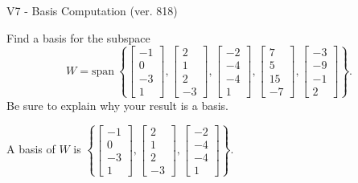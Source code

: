 \begin{exercise}
  \begin{exerciseTitle}V7 - Basis Computation (ver. 818)\end{exerciseTitle}
  \begin{exerciseStatement}
    Find a basis for the subspace 
\[W=\mathrm{span}\ \left\{\left[\begin{array}{r}
-1 \\
0 \\
-3 \\
1
\end{array}\right] , \left[\begin{array}{r}
2 \\
1 \\
2 \\
-3
\end{array}\right] , \left[\begin{array}{r}
-2 \\
-4 \\
-4 \\
1
\end{array}\right] , \left[\begin{array}{r}
7 \\
5 \\
15 \\
-7
\end{array}\right] , \left[\begin{array}{r}
-3 \\
-9 \\
-1 \\
2
\end{array}\right]\right\}.\]
 Be sure to explain why your result is a basis.


  \end{exerciseStatement}
  \begin{exerciseAnswer}
   A basis of \(W\) is  \(\left\{\left[\begin{array}{r}
-1 \\
0 \\
-3 \\
1
\end{array}\right] , \left[\begin{array}{r}
2 \\
1 \\
2 \\
-3
\end{array}\right] , \left[\begin{array}{r}
-2 \\
-4 \\
-4 \\
1
\end{array}\right]\right\}\).
  


  \end{exerciseAnswer}
\end{exercise}